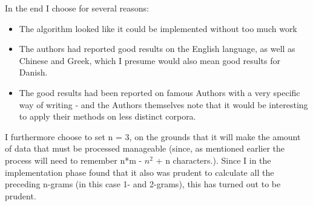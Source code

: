 In the end I choose \cite{nr4} for several reasons:
\begin{itemize}
\item The algorithm looked like it could be implemented without too much work
\item The authors had reported good results on the English language, as well as Chinese and Greek, which I presume would also mean good results for Danish.
\item The good results had been reported on famous Authors with a very specific way of writing - and the Authors themselves note that it would be interesting to apply their methods on less distinct corpora. 
\end{itemize}

I furthermore choose to set n = 3, on the grounds that it will make the amount of data that must be processed manageable (since, as mentioned earlier the process will need to remember n*m - $n^2$ + n characters.). Since I in the implementation phase found that it also was prudent to calculate all the preceding n-grams (in this case 1- and 2-grams), this has turned out to be prudent.  

